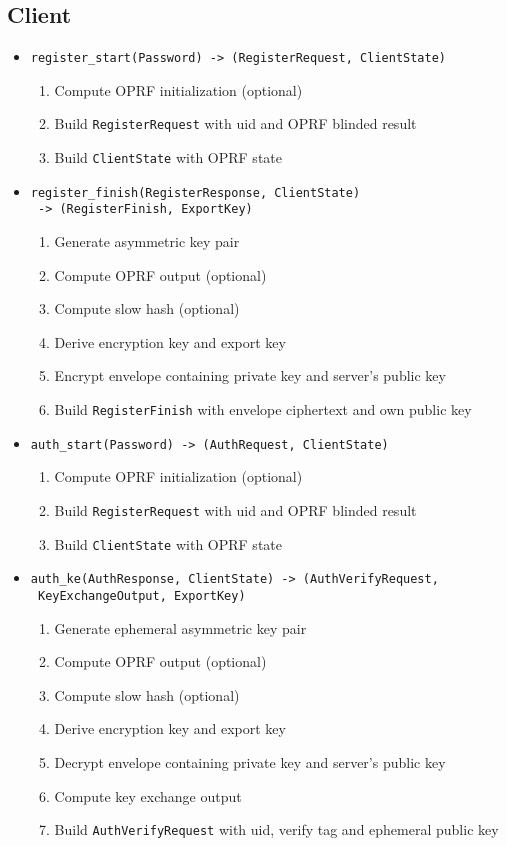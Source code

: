 ﻿\documentclass[../report.tex]{subfiles}
\begin{document}
\subsection{Client}
\begin{itemize}
 \item \verb|register_start(Password) -> (RegisterRequest, ClientState)|
  \begin{enumerate}
    \item Compute OPRF initialization (optional)
    \item Build \verb|RegisterRequest| with uid and OPRF blinded result
    \item Build \verb|ClientState| with OPRF state
  \end{enumerate}
  
 \item \verb|register_finish(RegisterResponse, ClientState)|\\
       \verb| -> (RegisterFinish, ExportKey)|
  \begin{enumerate}
    \item Generate asymmetric key pair
    \item Compute OPRF output (optional)
    \item Compute slow hash (optional)
    \item Derive encryption key and export key
    \item Encrypt envelope containing private key and server's public key
    \item Build \verb|RegisterFinish| with envelope ciphertext and own public key
  \end{enumerate}
 
 
 
 \item \verb|auth_start(Password) -> (AuthRequest, ClientState)|
   \begin{enumerate}
    \item Compute OPRF initialization (optional)
    \item Build \verb|RegisterRequest| with uid and OPRF blinded result
    \item Build \verb|ClientState| with OPRF state
  \end{enumerate}
  
 \item \verb|auth_ke(AuthResponse, ClientState) -> (AuthVerifyRequest,|\\
       \verb| KeyExchangeOutput, ExportKey)|
  \begin{enumerate}
    \item Generate ephemeral asymmetric key pair
    \item Compute OPRF output (optional)
    \item Compute slow hash (optional)
    \item Derive encryption key and export key
    \item Decrypt envelope containing private key and server's public key
    \item Compute key exchange output
    \item Build \verb|AuthVerifyRequest| with uid, verify tag and ephemeral public key
  \end{enumerate}
 

\end{itemize}
\end{document}
